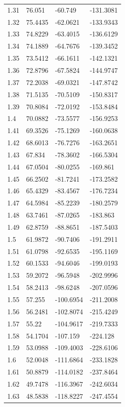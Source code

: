 \begin{tabular}{llll}
1.31 & 76.051 & -60.749 & -131.3081 \\
1.32 & 75.4435 & -62.0621 & -133.9343 \\
1.33 & 74.8229 & -63.4015 & -136.6129 \\
1.34 & 74.1889 & -64.7676 & -139.3452 \\
1.35 & 73.5412 & -66.1611 & -142.1321 \\
1.36 & 72.8796 & -67.5824 & -144.9747 \\
1.37 & 72.2038 & -69.0321 & -147.8742 \\
1.38 & 71.5135 & -70.5109 & -150.8317 \\
1.39 & 70.8084 & -72.0192 & -153.8484 \\
1.4 & 70.0882 & -73.5577 & -156.9253 \\
1.41 & 69.3526 & -75.1269 & -160.0638 \\
1.42 & 68.6013 & -76.7276 & -163.2651 \\
1.43 & 67.834 & -78.3602 & -166.5304 \\
1.44 & 67.0504 & -80.0255 & -169.861 \\
1.45 & 66.2502 & -81.7241 & -173.2582 \\
1.46 & 65.4329 & -83.4567 & -176.7234 \\
1.47 & 64.5984 & -85.2239 & -180.2579 \\
1.48 & 63.7461 & -87.0265 & -183.863 \\
1.49 & 62.8759 & -88.8651 & -187.5403 \\
1.5 & 61.9872 & -90.7406 & -191.2911 \\
1.51 & 61.0798 & -92.6535 & -195.1169 \\
1.52 & 60.1533 & -94.6046 & -199.0193 \\
1.53 & 59.2072 & -96.5948 & -202.9996 \\
1.54 & 58.2413 & -98.6248 & -207.0596 \\
1.55 & 57.255 & -100.6954 & -211.2008 \\
1.56 & 56.2481 & -102.8074 & -215.4249 \\
1.57 & 55.22 & -104.9617 & -219.7333 \\
1.58 & 54.1704 & -107.159 & -224.128 \\
1.59 & 53.0988 & -109.4003 & -228.6106 \\
1.6 & 52.0048 & -111.6864 & -233.1828 \\
1.61 & 50.8879 & -114.0182 & -237.8464 \\
1.62 & 49.7478 & -116.3967 & -242.6034 \\
1.63 & 48.5838 & -118.8227 & -247.4554 \\

\end{tabular}
